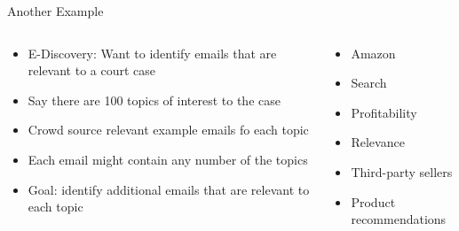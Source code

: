 \documentclass[aspectratio=169]{beamer}
\begin{document}
%
%
\begin{frame}{Another Example}

\begin{columns}
\begin{column}{0.6\textwidth}
\begin{itemize}
	\item E-Discovery: Want to identify emails that are relevant to a court case
	\item Say there are 100 topics of interest to the case 
	\item Crowd source relevant example emails fo each topic
	\item Each email might contain any number of the topics
	\item Goal: identify additional emails that are relevant to each topic
\end{itemize}
\end{column}
\begin{column}{0.4\textwidth}
\begin{itemize}
	\item Amazon
	\item Search
	\item Profitability
	\item Relevance
	\item Third-party sellers 
	\item Product recommendations
\end{itemize}
\end{column}
\end{columns}
\end{frame}
\end{document}
